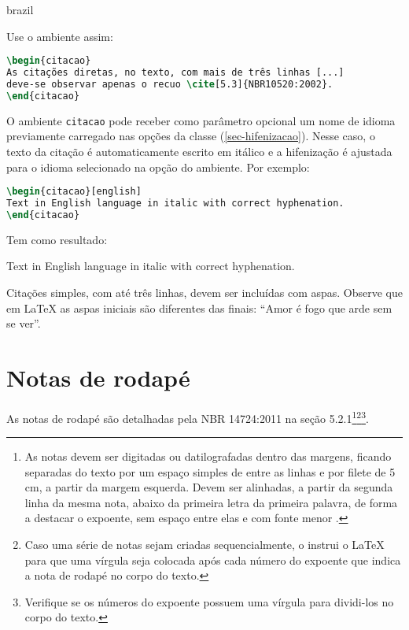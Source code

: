 \begin{otherlanguage*}{brazil}
\begin{citacao}
\end{citacao}


Use o ambiente assim:

\begin{lstlisting}[language=tex]
\begin{citacao}
As citações diretas, no texto, com mais de três linhas [...]
deve-se observar apenas o recuo \cite[5.3]{NBR10520:2002}.
\end{citacao}
\end{lstlisting}



O ambiente \texttt{citacao} pode receber como parâmetro opcional um nome de
idioma previamente carregado nas opções da classe (\autoref{sec-hifenizacao}). Nesse
caso, o texto da citação é automaticamente escrito em itálico e a hifenização é
ajustada para o idioma selecionado na opção do ambiente. Por exemplo:

\begin{lstlisting}[language=tex]
\begin{citacao}[english]
Text in English language in italic with correct hyphenation.
\end{citacao}
\end{lstlisting}

Tem como resultado:

\begin{citacao}[english]
Text in English language in italic with correct hyphenation.
\end{citacao}

Citações simples, com até três linhas, devem ser
incluídas com aspas. Observe que em \LaTeX{} as aspas iniciais são diferentes das
finais: ``Amor é fogo que arde sem se ver''.

\section{Notas de rodapé}

As notas de rodapé são detalhadas pela NBR 14724:2011 na seção 5.2.1\footnote{As
notas devem ser digitadas ou datilografadas dentro das margens, ficando
separadas do texto por um espaço simples de entre as linhas e por filete de 5
cm, a partir da margem esquerda. Devem ser alinhadas, a partir da segunda linha
da mesma nota, abaixo da primeira letra da primeira palavra, de forma a destacar
o expoente, sem espaço entre elas e com fonte menor
\textcite[5.2.1]{NBR14724:2011}.}\footnote{Caso uma série de notas sejam
criadas sequencialmente, o \abnTeX{} instrui o \LaTeX{} para que uma vírgula seja
colocada após cada número do expoente que indica a nota de rodapé no corpo do
texto.}\footnote{Verifique se os números do expoente possuem uma vírgula para
dividi-los no corpo do texto.}.



\end{otherlanguage*}
